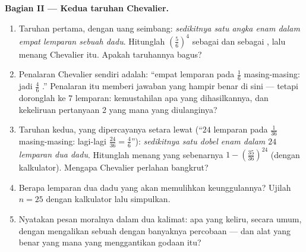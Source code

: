 \begin{problem}
\medskip
\noindent\textbf{Bagian II --- Kedua taruhan Chevalier.}
\begin{enumerate}[resume]
  \item Taruhan pertama, dengan uang seimbang: \emph{sedikitnya satu
        angka enam dalam empat lemparan sebuah dadu}. Hitunglah
        $\left(\frac56\right)^4$ sebagai  dan sebagai , lalu  menang Chevalier itu. Apakah taruhannya
        bagus?
  \item Penalaran Chevalier sendiri adalah: ``empat lemparan pada
        $\frac16$ masing-masing: jadi $\frac46$ .'' Penalaran
        itu memberi jawaban yang hampir benar di sini --- tetapi
        doronglah ke $7$ lemparan: kemustahilan apa yang
        dihasilkannya, dan kekeliruan pertanyaan 2 yang mana yang
        diulanginya?
  \item Taruhan kedua, yang dipercayanya setara lewat  (``$24$ lemparan pada $\frac1{36}$ masing-masing:
        lagi-lagi $\frac{24}{36} = \frac46$''): \emph{sedikitnya satu
        dobel enam dalam $24$ lemparan dua dadu}. Hitunglah 
        menang yang sebenarnya $1 - \left(\frac{35}{36}\right)^{24}$
        (dengan kalkulator). Mengapa Chevalier perlahan bangkrut?
  \item Berapa lemparan dua dadu yang akan memulihkan keunggulannya?
        Ujilah $n = 25$ dengan kalkulator lalu simpulkan.
  \item Nyatakan pesan moralnya dalam dua kalimat: apa yang keliru,
        secara umum, dengan mengalikan sebuah  dengan
        banyaknya percobaan --- dan alat yang benar yang mana yang
        menggantikan godaan itu?
\end{enumerate}


\end{problem}
